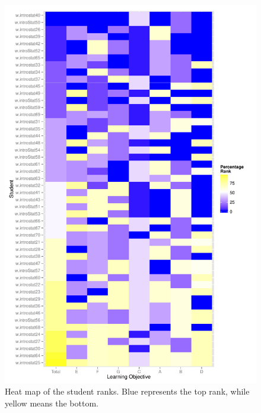 \documentclass[12pt,english,nohyper]{tufte-handout}\usepackage[]{graphicx}\usepackage[]{color}
\makeatletter
\newenvironment{kframe}{%
 \def\at@end@of@kframe{}%
 \ifinner\ifhmode%
  \def\at@end@of@kframe{\end{minipage}}%
  \begin{minipage}{\columnwidth}%
 \fi\fi%
 \def\FrameCommand##1{\hskip\@totalleftmargin \hskip-\fboxsep
 \colorbox{shadecolor}{##1}\hskip-\fboxsep
     \hskip-\linewidth \hskip-\@totalleftmargin \hskip\columnwidth}%
 \MakeFramed {\advance\hsize-\width
   \@totalleftmargin\z@ \linewidth\hsize
   \@setminipage}}%
 {\par\unskip\endMakeFramed%
 \at@end@of@kframe}
\makeatother
\begin{document}
\begin{kframe}

{\ttfamily\noindent\color{warningcolor}{\#\# Warning: Non Lab interpolation is deprecated}}\end{kframe}\begin{center}
\begin{figure}
\begin{centering}
\includegraphics[width=0.99\linewidth]{Topic06_AB_tile_student_rank}
\par\end{centering}
\caption{\label{fig:LearningObj_rank}Heat map of the student ranks. Blue represents the top rank, while yellow means the bottom.}
\end{figure}\par\end{center}
\end{document}
